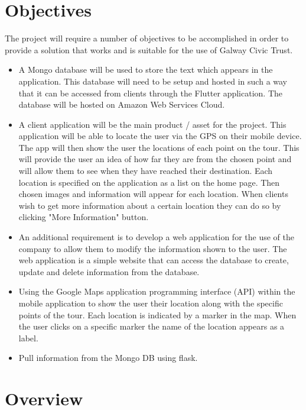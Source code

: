 \section{Objectives} 

The project will require a number of objectives to be accomplished in order to provide a solution that works and is suitable for the use of Galway Civic Trust. 

\begin{itemize}
\item A Mongo database will be used to store the text which appears in the application. This database will need to be setup and hosted in such a way that it can be accessed from clients through the Flutter application. The database will be hosted on Amazon Web Services Cloud.

\item A client application will be the main product / asset for the project. This application will be able to locate the user via the GPS on their mobile device. The app will then show the user the locations of each point on the tour. This will provide the user an idea of how far they are from the chosen point and will allow them to see when they have reached their destination. Each location is specified on the application as a list on the home page. Then chosen images and information will appear for each location. When clients wish to get more information about a certain location they can do so by clicking "More Information" button.

\item An additional requirement is to develop a web application for the use of the company to allow them to modify the information shown to the user. The web application is a simple website that can access the database to create, update and delete information from the database.

\item Using the Google Maps application programming interface (API) within the mobile application to show the user their location along with the specific points of the tour. Each location is indicated by a marker in the map. When the user clicks on a specific marker the name of the location appears as a label.

\item Pull information from the Mongo DB using flask.


\end{itemize}
\section{Overview}

